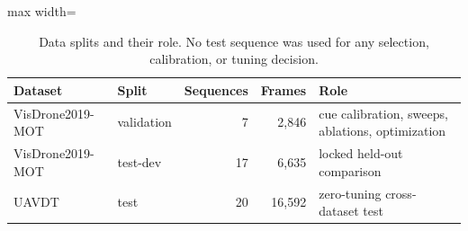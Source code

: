 \begin{table}[tbp]
\centering
\caption{Data splits and their role. No test sequence was used for any selection, calibration, or tuning decision.}
\label{tab:ch4-data}
\small\setlength{\tabcolsep}{4pt}
\begin{adjustbox}{max width=\textwidth}
\begin{tabular}{llrrl}
\hline
Dataset & Split & Sequences & Frames & Role \\
\hline
VisDrone2019-MOT & validation & 7 & 2,846 & cue calibration, sweeps, ablations, optimization \\
VisDrone2019-MOT & test-dev & 17 & 6,635 & locked held-out comparison \\
UAVDT & test & 20 & 16,592 & zero-tuning cross-dataset test \\
\hline
\end{tabular}
\end{adjustbox}
\end{table}
